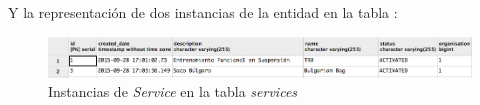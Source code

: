 Y la representación de dos instancias de la entidad  en la tabla :

\begin{figure}[H]
\centering
  \includegraphics[scale=.50]{img/services-rows.jpg}
  \caption{Instancias de \textit{Service} en la tabla \textit{services}}
  \label{fig:services-rows}
\end{figure}












